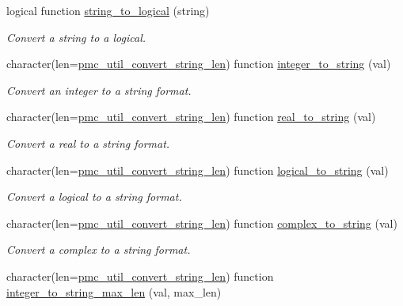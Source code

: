 \begin{DoxyCompactItemize}
logical function \mbox{\hyperlink{namespacepmc__util_addbacdfdd34c9190924403097f717ab4}{string\+\_\+to\+\_\+logical}} (string)
\begin{DoxyCompactList}\small\item\em Convert a string to a logical. \end{DoxyCompactList}\item 
character(len=\mbox{\hyperlink{namespacepmc__util_afd468d26aef28509c08087ba8e59089a}{pmc\+\_\+util\+\_\+convert\+\_\+string\+\_\+len}}) function \mbox{\hyperlink{namespacepmc__util_ab5a72413552c4a653ddafc47e28a2f14}{integer\+\_\+to\+\_\+string}} (val)
\begin{DoxyCompactList}\small\item\em Convert an integer to a string format. \end{DoxyCompactList}\item 
character(len=\mbox{\hyperlink{namespacepmc__util_afd468d26aef28509c08087ba8e59089a}{pmc\+\_\+util\+\_\+convert\+\_\+string\+\_\+len}}) function \mbox{\hyperlink{namespacepmc__util_a5f80ccbbb2709c6f8458a1f7742aa549}{real\+\_\+to\+\_\+string}} (val)
\begin{DoxyCompactList}\small\item\em Convert a real to a string format. \end{DoxyCompactList}\item 
character(len=\mbox{\hyperlink{namespacepmc__util_afd468d26aef28509c08087ba8e59089a}{pmc\+\_\+util\+\_\+convert\+\_\+string\+\_\+len}}) function \mbox{\hyperlink{namespacepmc__util_a92e778281860ee189704e0f1f2c19e86}{logical\+\_\+to\+\_\+string}} (val)
\begin{DoxyCompactList}\small\item\em Convert a logical to a string format. \end{DoxyCompactList}\item 
character(len=\mbox{\hyperlink{namespacepmc__util_afd468d26aef28509c08087ba8e59089a}{pmc\+\_\+util\+\_\+convert\+\_\+string\+\_\+len}}) function \mbox{\hyperlink{namespacepmc__util_a1c459fd59d9acef65849cc5fd388d386}{complex\+\_\+to\+\_\+string}} (val)
\begin{DoxyCompactList}\small\item\em Convert a complex to a string format. \end{DoxyCompactList}\item 
character(len=\mbox{\hyperlink{namespacepmc__util_afd468d26aef28509c08087ba8e59089a}{pmc\+\_\+util\+\_\+convert\+\_\+string\+\_\+len}}) function \mbox{\hyperlink{namespacepmc__util_a702884cdee8fa1da41a3bf8b460c95d3}{integer\+\_\+to\+\_\+string\+\_\+max\+\_\+len}} (val, max\+\_\+len)

\end{DoxyCompactItemize}
